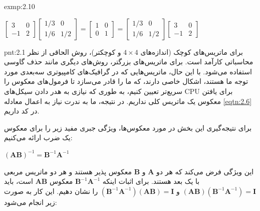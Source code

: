 {\begin{spacing}{1.5}
\begin{exmp}{exmp:2.10}
            \begin{center}
                $\begin{bmatrix}
                     3  & 0 \\
                     -1 & 2
                \end{bmatrix}\begin{bmatrix}
                                 1/3 & 0   \\
                                 1/6 & 1/2
                \end{bmatrix}=\begin{bmatrix}
                                  1 & 0 \\
                                  0 & 1
                \end{bmatrix}=\begin{bmatrix}
                                  1/3 & 0   \\
                                  1/6 & 1/2
                \end{bmatrix}\begin{bmatrix}
                                 3  & 0 \\
                                 -1 & 2
                \end{bmatrix}$
            \end{center}
        \end{exmp}

        \begin{point}{pnt:2.1}
            \Large
            برای ماتریس‌های کوچک (اندازه‌های $4\times 4$ و کوچکتر)، روش الحاقی از نظر محاسباتی کارآمد است.
            برای ماتریس‌های بزرگتر، روش‌های دیگری مانند حذف گاوسی استفاده می‌شود.
            با این حال، ماتریس‌هایی که در گرافیک‌های کامپیوتری سه‌بعدی مورد توجه ما هستند،
            اشکال خاصی دارند، که ما را قادر می‌سازد تا فرمول‌های معکوس را سریع‌تر تعیین کنیم،
            به طوری که نیازی به هدر دادن سیکل‌های CPU برای یافتن معکوس یک ماتریس کلی نداریم.
            در نتیجه، ما به ندرت نیاز به اعمال معادله \ref{eqtn:2.6} در کد داریم.
        \end{point}

        برای نتیجه‌گیری این بخش در مورد معکوس‌ها، ویژگی جبری مفید زیر را برای معکوس یک ضرب ارائه می‌کنیم:

        \begin{center}
            $(\textbf{AB})^{-1}=\textbf{B}^{-1}\textbf{A}^{-1}$
        \end{center}

        این ویژگی فرض می‌کند که هر دو $\textbf{A}$ و $\textbf{B}$ معکوس پذیر هستند و هر دو ماتریس مربعی با یک بعد هستند.
        برای اثبات اینکه $\textbf{B}^{-1}\textbf{A}^{-1}$ معکوس $\textbf{AB}$ است، باید $(\textbf{AB})(\textbf{B}^{-1}\textbf{A}^{-1})=\textbf{I}$ و $(\textbf{B}^{-1}\textbf{A}^{-1})(\textbf{AB})=\textbf{I}$ را نشان دهیم.
        این کار به صورت زیر انجام می‌شود:


\end{spacing}}
